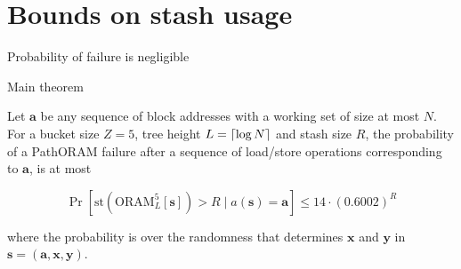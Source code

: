 \section{Bounds on stash usage}

	\begin{frame}{Probability of failure is negligible}
		
		\begin{block}{Main theorem}

			Let $\bm{a}$ be any sequence of block addresses with a working set of size at most $N$. 
			For a bucket size $Z = 5$, tree height $L = \lceil\log N\rceil$ and stash size $R$, the probability of a PathORAM failure after a sequence of load/store operations corresponding to $\bm{a}$, is at most
			
			\[
				\Pr \left[ \text{st} \left( \text{ORAM}_L^5 [ \bm{s} ] \right) > R \; | \; a( \bm{s} ) = \bm{a} \right] \le 14 \cdot (0.6002)^R
			\]

			where the probability is over the randomness that determines $\bm{x}$ and $\bm{y}$ in $\bm{s = (a, x, y)}$.

		\end{block}

	\end{frame}

